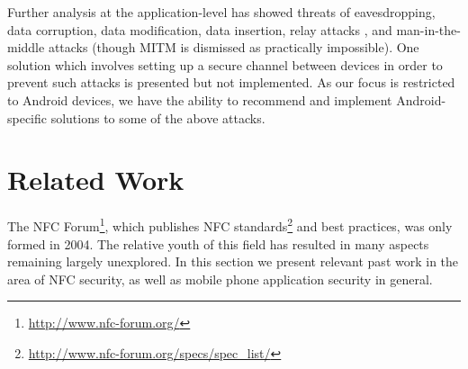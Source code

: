 \documentclass[12pt]{article}
\begin{document}
Further analysis at the application-level has showed threats of eavesdropping, data corruption, data modification, data insertion, relay attacks \cite{francis2012}, and man-in-the-middle attacks (though MITM is dismissed as practically impossible).
One solution \cite{haselsteiner2006} which involves setting up a secure channel between devices in order to prevent such attacks is presented but not implemented. As our focus is restricted to Android devices, we have the ability to recommend and implement Android-specific solutions to some of the above attacks. 

\section{Related Work}
The NFC Forum\footnote{\url{http://www.nfc-forum.org/}}, which publishes NFC standards\footnote{\url{http://www.nfc-forum.org/specs/spec_list/}} and best practices, was only formed in 2004.
The relative youth of this field has resulted in many aspects remaining largely unexplored.
In this section we present relevant past work in the area of NFC security, as well as mobile phone application security in general.
\end{document}
